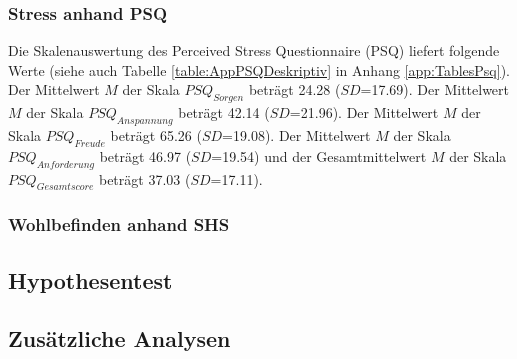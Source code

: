 \subsubsection{Stress anhand PSQ}
Die Skalenauswertung des Perceived Stress Questionnaire (PSQ) liefert folgende Werte (siehe auch Tabelle \ref{table:AppPSQDeskriptiv} in Anhang \ref{app:TablesPsq}). Der Mittelwert $M$ der Skala $PSQ_{Sorgen}$ beträgt 24.28 ($SD$=17.69). Der Mittelwert $M$ der Skala $PSQ_{Anspannung}$ beträgt 42.14 ($SD$=21.96). Der Mittelwert $M$ der Skala $PSQ_{Freude}$ beträgt 65.26 ($SD$=19.08). Der Mittelwert $M$ der Skala $PSQ_{Anforderung}$ beträgt 46.97 ($SD$=19.54) und der Gesamtmittelwert $M$ der Skala $PSQ_{Gesamtscore}$ beträgt 37.03 ($SD$=17.11).


\subsubsection{Wohlbefinden anhand SHS}


\subsection{Hypothesentest} \label{sec:Hypothesentest}

\subsection{Zusätzliche Analysen} \label{sec:ZusätzlicheAnalysen}